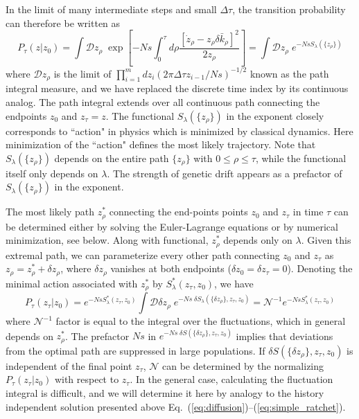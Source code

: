 \documentclass[rmp,preprint]{revtex4}
\newcommand{\EQ}[1]{Eq.~(\ref{eq:#1})}
\newcommand{\xz}{z}
\newcommand{\dk}{\delta \bar{k}}
\newcommand{\tx}[1]{\xz_{#1}}
\newcommand{\Smin}{S^*}
\begin{document}
In the limit of many intermediate steps and small $\Delta \tau$, the transition probability can therefore be written as 
\begin{equation}
\label{eq:path_integral}
P_\tau(\xz|\tx{0}) = \int \mathcal{D} \tx{\rho} \; \exp\left[-Ns \int_0^\tau d\rho \frac{[\dot{\xz}_{\rho} - \tx{\rho}\dk_\rho]^2}{2\tx{\rho}}\right]  = \int \mathcal{D} \tx{\rho} \; e^{-Ns S_{\lambda}(\{ \tx{\rho} \})}
\end{equation}
where $\mathcal{D} \tx{\rho}$ is the limit of $\prod_{i=1}^m d\tx{i}(2\pi \Delta \tau \tx{i-1}/Ns)^{-1/2}$ known as the path integral measure, and we have replaced the discrete time index by its continuous analog. The path integral extends over all continuous path connecting the endpoints $\tx{0}$ and $\tx{\tau}=\xz$. 
The functional $S_{\lambda}(\{\tx{\rho}\})$ in the exponent closely corresponds to ``action" in physics \citep{Feynman:1965} which is minimized by classical dynamics. Here minimization of the ``action" defines the most likely trajectory. Note that $S_{\lambda}(\{\tx{\rho}\})$ depends on the entire path $\{ \tx{\rho}\}$ with $0\leq \rho \leq \tau$, while the functional itself only depends on $\lambda$. The strength of genetic drift appears as a prefactor of $S_{\lambda}(\{\tx{\rho}\})$ in the exponent. 

The most likely path $\tx{\rho}^*$ connecting the end-points points $\tx{0}$ and $\tx{\tau}$ in time $\tau$ can be determined either by solving the Euler-Lagrange equations or by numerical minimization, see below. Along with functional, $\tx{\rho}^*$ depends only on $\lambda$. Given this extremal path, we can parameterize every other path connecting $\tx{0}$ and $\tx{\tau}$ as $\tx{\rho}=\tx{\rho}^* + \delta \tx{\rho}$, where $\delta \tx{\rho}$ vanishes at both endpoints ($\delta \tx{0} = \delta \tx{\tau}=0$). Denoting the minimal action associated with $\tx{\rho}^*$ by  $\Smin_{\lambda}(\tx{\tau} ,\tx{0})$, we have
\begin{equation}
P_{\tau}(\tx{\tau} |\tx{0}) = e^{-Ns\Smin_{\lambda}(\tx{\tau} ,\tx{0})} \int \mathcal{D} \delta \tx{\rho} \; e^{-Ns\; \delta S_{\lambda}(\{\delta\tx{\rho}\}, \tx{\tau}, \tx{0})}  = \mathcal{N}^{-1} e^{-Ns\Smin_{\lambda}(\tx{\tau} ,\tx{0})}
\end{equation}
where $\mathcal{N}^{-1}$ factor is equal to the integral over the fluctuations, which in general depends on $\tx{\rho}^*$. The prefactor $Ns$ in $e^{-Ns\; \delta S(\{\delta\tx{\rho}\}, \tx{\tau}, \tx{0})}$ implies that deviations from the optimal path are suppressed in large populations. If $\delta S(\{\delta \tx{\rho}\}, \tx{\tau}, \tx{0})$ is independent of the final point $\tx{\tau}$,  $\mathcal{N}$ can be determined by the normalizing $P_{\tau}(\tx{\tau} |\tx{0})$ with respect to $\tx{\tau}$. In the general case, calculating the fluctuation integral is difficult, and we will determine it here by analogy to the history independent solution presented above \EQ{diffusion}--(\ref{eq:simple_ratchet}).
\end{document}
